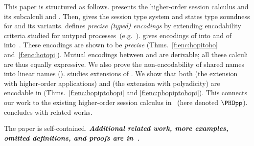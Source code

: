  This paper 
is structured as follows.
{} presents the higher-order session calculus \HOp and its 
subcalculi \HO and \sessp.  Then,  gives the session type system
and states type soundness for \HOp and its variants.
{} defines \emph{precise (typed) encodings} by extending encodability criteria 
studied for
untyped processes~(e.g.~\cite{DBLP:journals/iandc/Gorla10,DBLP:conf/icalp/LanesePSS10}).
{} %
gives encodings of \HOp into \HO and of \HOp into~\sessp.
These encodings 
are shown to be \emph{precise} (Thms.~\ref{f:enc:hopitoho} and~\ref{f:enc:hotopi}).
Mutual encodings between \sessp and \HO are derivable; 
all these calculi are thus equally expressive.
We also prove the non-encodability of shared names
into linear names ().
{} studies extensions of \HOp. We show that 
both \HOpp (the extension with higher-order applications) 
and \pHOp (the extension with polyadicity) are encodable in \HOp
(Thms.~\ref{f:enc:hopiptohopi} and \ref{f:enc:phopiptohopi}).
This connects our work 
to the existing
higher-order session calculus in~\cite{tlca07} (here denoted  $\PHOpp$).
{} concludes with related works. 

The paper is self-contained. 
{\bf\em Additional related work, more examples, omitted definitions, and  proofs 
are 
in~\cite{KouzapasPY15}.} 

